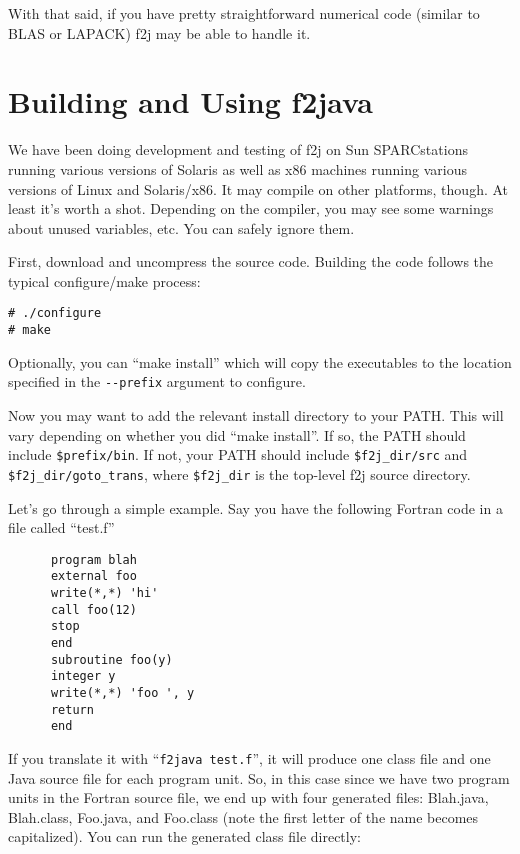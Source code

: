 \documentclass[11pt]{article}
\begin{document}
With that said, if you have pretty straightforward numerical code (similar to
BLAS or LAPACK) f2j may be able to handle it.

\section{Building and Using f2java}

We have been doing development and testing of f2j on Sun SPARCstations running
various versions of Solaris as well as x86 machines running various versions
of Linux and Solaris/x86.  It may compile on
other platforms, though.  At least it's worth a shot.  Depending on the compiler,
you may see some warnings about unused variables, etc.  You can safely ignore
them.

First, download and uncompress the source code.  Building the code follows the typical configure/make process:

\begin{verbatim}
# ./configure
# make
\end{verbatim}

Optionally, you can ``make install'' which will copy the executables to the
location specified in the \verb|--prefix| argument to configure.

Now you may want to add the relevant install directory to your PATH.  This
will vary depending on whether you did ``make install''.  If so, the PATH
should include \verb|$prefix/bin|.  If not, your PATH should include
\verb|$f2j_dir/src| and \verb|$f2j_dir/goto_trans|, where \verb|$f2j_dir|
is the top-level f2j source directory.

Let's go through a simple example.  Say you have the following Fortran code in a file 
called ``test.f''

\begin{verbatim}
      program blah
      external foo
      write(*,*) 'hi'
      call foo(12)
      stop
      end
      subroutine foo(y)
      integer y
      write(*,*) 'foo ', y
      return
      end
\end{verbatim}

If you translate it with ``\verb|f2java test.f|'', it will produce one class file and
one Java source file for each program unit.  So, in this case since we have 
two program units in the Fortran source file, we end up with four generated files:
Blah.java, Blah.class, Foo.java, and Foo.class (note the first letter
of the name becomes
capitalized).  You can run the generated class file directly:
\end{document}
